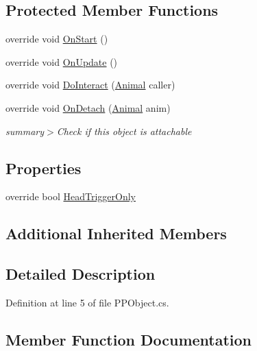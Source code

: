 \subsection*{Protected Member Functions}
\begin{DoxyCompactItemize}
\item 
override void \mbox{\hyperlink{class_p_p_object_a365b36598fc60a7d6470147aae73121b}{On\+Start}} ()
\item 
override void \mbox{\hyperlink{class_p_p_object_a74855705698504fae01ef77b0cee6313}{On\+Update}} ()
\item 
override void \mbox{\hyperlink{class_p_p_object_a3359bdf648e8252f0d7326c65bbf9d73}{Do\+Interact}} (\mbox{\hyperlink{class_animal}{Animal}} caller)
\item 
override void \mbox{\hyperlink{class_p_p_object_a2cf5c46651860b997fd937c30e29d6b8}{On\+Detach}} (\mbox{\hyperlink{class_animal}{Animal}} anim)
\begin{DoxyCompactList}\small\item\em summary$>$Check if this object is attachable\end{DoxyCompactList}\end{DoxyCompactItemize}
\subsection*{Properties}
\begin{DoxyCompactItemize}
\item 
override bool \mbox{\hyperlink{class_p_p_object_a240d0da4ac929975c3091d6a8ecf297e}{Head\+Trigger\+Only}}
\end{DoxyCompactItemize}
\subsection*{Additional Inherited Members}


\subsection{Detailed Description}


Definition at line 5 of file P\+P\+Object.\+cs.



\subsection{Member Function Documentation}
\mbox{\label{class_p_p_object_a3359bdf648e8252f0d7326c65bbf9d73}} 
